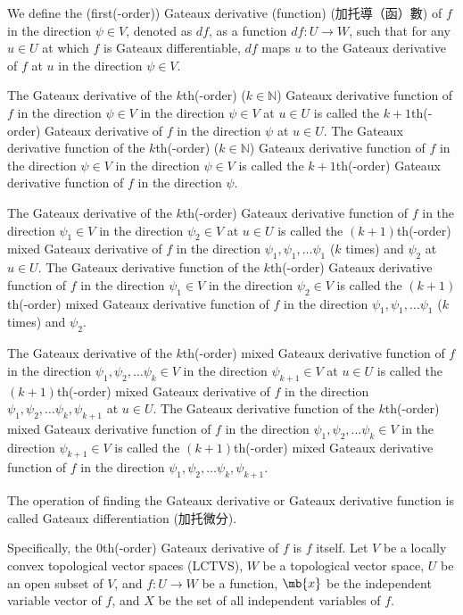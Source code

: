 \documentclass[a4paper,12pt]{report}
\begin{document}
\begin{itemize}
\begin{itemize}
We define the (first(-order)) Gateaux derivative (function) (加托導（函）數) of $f$ in the direction $\psi \in V$, denoted as $df$, as a function $df\colon U\to W$, such that for any $u\in U$ at which $f$ is Gateaux differentiable, $df$ maps $u$ to the Gateaux derivative of $f$ at $u$ in the direction $\psi \in V$.

The Gateaux derivative of the $k$th(-order) ($k\in\mathbb{N}$) Gateaux derivative function of $f$ in the direction $\psi \in V$ in the direction $\psi \in V$ at $u\in U$ is called the $k+1$th(-order) Gateaux derivative of $f$ in the direction $\psi$ at $u\in U$. The Gateaux derivative function of the $k$th(-order) ($k\in\mathbb{N}$) Gateaux derivative function of $f$ in the direction $\psi \in V$ in the direction $\psi \in V$ is called the $k+1$th(-order) Gateaux derivative function of $f$ in the direction $\psi$.

The Gateaux derivative of the $k$th(-order) Gateaux derivative function of $f$ in the direction $\psi_1\in V$ in the direction $\psi_2\in V$ at $u\in U$ is called the $(k+1)$th(-order) mixed Gateaux derivative of $f$ in the direction $\psi_1,\psi_1,\dots \psi_1$ ($k$ times) and $\psi_2$ at $u\in U$. The Gateaux derivative function of the $k$th(-order) Gateaux derivative function of $f$ in the direction $\psi_1\in V$ in the direction $\psi_2\in V$ is called the $(k+1)$th(-order) mixed Gateaux derivative function of $f$ in the direction $\psi_1,\psi_1,\dots \psi_1$ ($k$ times) and $\psi_2$.

The Gateaux derivative of the $k$th(-order) mixed Gateaux derivative function of $f$ in the direction $\psi_1,\psi_2,\dots \psi_k\in V$ in the direction $\psi_{k+1}\in V$ at $u\in U$ is called the $(k+1)$th(-order) mixed Gateaux derivative of $f$ in the direction $\psi_1,\psi_2,\dots \psi_k,\psi_{k+1}$ at $u\in U$. The Gateaux derivative function of the $k$th(-order) mixed Gateaux derivative function of $f$ in the direction $\psi_1,\psi_2,\dots \psi_k\in V$ in the direction $\psi_{k+1}\in V$ is called the $(k+1)$th(-order) mixed Gateaux derivative function of $f$ in the direction $\psi_1,\psi_2,\dots \psi_k,\psi_{k+1}$.

The operation of finding the Gateaux derivative or Gateaux derivative function is called Gateaux differentiation (加托微分).

Specifically, the $0$th(-order) Gateaux derivative of $f$ is $f$ itself.
Let $V$ be a locally convex topological vector spaces (LCTVS), $W$ be a topological vector space, $U$ be an open subset of $V$, and $f\colon U\to W$ be a function, $\mb{x}$ be the independent variable vector of $f$, and $X$ be the set of all independent variables of $f$.


\end{itemize}
\end{itemize}
\end{document}
